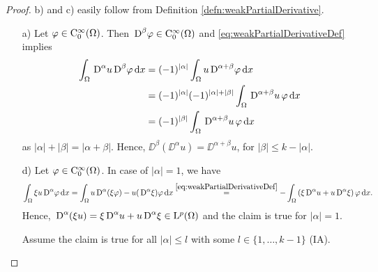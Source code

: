 \begin{proof}
  b) and c) easily follow from Definition \ref{defn:weakPartialDerivative}.

  \begin{enumerate}
  \item[a)] Let $\varphi \in \mathrm{C}_0^\infty(\Omega)$. 
    Then $\,{\operatorname{D}}^\beta \varphi \in \mathrm{C}_0^\infty(\Omega)$ and \eqref{eq:weakPartialDerivativeDef} implies
  \begin{align*}
    \int_\Omega \,{\operatorname{D}}^\alpha u \,{\operatorname{D}}^\beta \varphi \, {\operatorname{d}\!{x}}
    &= (-1)^{|\alpha|} \int_\Omega u \,{\operatorname{D}}^{\alpha + \beta} \varphi \, {\operatorname{d}\!{x}} \\
    &= (-1)^{|\alpha|} (-1)^{|\alpha| + |\beta|} \int_\Omega \,{\operatorname{D}}^{\alpha + \beta} u \, \varphi \, {\operatorname{d}\!{x}} \\
    &= (-1)^{|\beta|} \int_\Omega \,{\operatorname{D}}^{\alpha + \beta} u \, \varphi \, {\operatorname{d}\!{x}}
  \end{align*}
  as $|\alpha| + |\beta| = |\alpha + \beta|$.
      Hence, $\DD^\beta(\DD^\alpha u) = \DD^{\alpha + \beta} u$, for $|\beta| \leq k - |\alpha|$.

    \item[d)] Let $\varphi \in \mathrm{C}_0^\infty(\Omega)$. 
      In case of $|\alpha| = 1$, we have
      $$
      \int_\Omega \xi u \,{\operatorname{D}}^\alpha \varphi \, {\operatorname{d}\!{x}} 
      = \int_\Omega u \,{\operatorname{D}}^\alpha(\xi \varphi) - u(\,{\operatorname{D}}^\alpha \xi) \varphi \, {\operatorname{d}\!{x}} 
      \overset{\eqref{eq:weakPartialDerivativeDef}}{=} 
      -\int_\Omega \left( \xi \,{\operatorname{D}}^\alpha u + u \,{\operatorname{D}}^\alpha \xi \right) \varphi \, {\operatorname{d}\!{x}}.
      $$
      Hence, $\,{\operatorname{D}}^\alpha(\xi u) = \xi \,{\operatorname{D}}^\alpha u + u \,{\operatorname{D}}^\alpha \xi \in \mathrm{L}^p(\Omega)$ and the claim is true for $|\alpha| = 1$.

      Assume the claim is true for all $|\alpha| \leq l$ with some $l \in \{1,\dots,k-1\}$ (IA).


\end{enumerate}
\end{proof}
